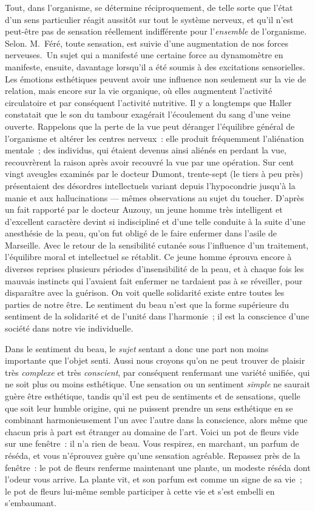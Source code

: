 \documentclass[french,twoside]{book} %
\begin{document}
Tout, dans l’organisme, se détermine réciproquement, de telle sorte que l’état d’un sens particulier réagit aussitôt sur tout le système nerveux, et qu’il n’est peut-être pas de sensation réellement indifférente pour l’\emph{ensemble} de l’organisme. Selon. M. Féré, toute sensation, est suivie d’une augmentation de nos forces nerveuses. Un sujet qui a manifesté une certaine force au dynamomètre en manifeste, ensuite, davantage lorsqu’il a été soumis à des excitations sensorielles. Les émotions esthétiques peuvent avoir une influence non seulement sur la vie de relation, mais encore sur la vie organique, où elles augmentent l’activité circulatoire et par conséquent l’activité nutritive. Il y a longtemps que Haller constatait que le son du tambour exagérait l’écoulement du sang d’une veine ouverte. Rappelons que la perte de la vue peut déranger l’équilibre général de l’organisme et altérer les centres nerveux : elle produit fréquemment l’aliénation mentale ; des individus, qui étaient devenus ainsi aliénés en perdant la vue, recouvrèrent la raison après avoir recouvré la vue par une opération. Sur cent vingt aveugles examinés par le docteur Dumont, trente-sept (le tiers à peu près) présentaient des désordres intellectuels variant depuis l’hypocondrie jusqu’à la manie et aux hallucinations — mêmes observations au sujet du toucher. D’après un fait rapporté par le docteur Auzouy, un jeune homme très intelligent et d’excellent caractère devint si indiscipliné et d’une telle conduite à la suite d’une anesthésie de la peau, qu’on fut obligé de le faire enfermer dans l’asile de Marseille. Avec le retour de la sensibilité cutanée sous l’influence d’un traitement, l’équilibre moral et intellectuel se rétablit. Ce jeune homme éprouva encore à diverses reprises plusieurs périodes d’insensibilité de la peau, et à chaque fois les mauvais instincts qui l’avaient fait enfermer ne tardaient pas à se réveiller, pour disparaître avec la guérison. On voit quelle solidarité existe entre toutes les parties de notre être. Le sentiment du beau n’est que la forme supérieure du sentiment de la solidarité et de l’unité dans l’harmonie ; il est la conscience d’une société dans notre vie individuelle.\par
Dans le sentiment du beau, le \emph{sujet} sentant a donc une part non moins importante que l’objet senti. Aussi nous croyons qu’on ne peut trouver de plaisir très \emph{complexe} et très \emph{conscient}, par conséquent renfermant une variété unifiée, qui ne soit plus ou moins esthétique. Une sensation ou un sentiment \emph{simple} ne saurait guère être esthétique, tandis qu’il est peu de sentiments et de sensations, quelle que soit leur humble origine, qui ne puissent prendre un sens esthétique en se combinant harmonieusement l’un avec l’autre dans la conscience, alors même que chacun pris à part est étranger au domaine de l’art. Voici un pot de fleurs vide sur une fenêtre : il n’a rien de beau. Vous respirez, en marchant, un parfum de réséda, et vous n’éprouvez guère qu’une sensation agréable. Repassez près de la fenêtre : le pot de fleurs renferme maintenant une plante, un modeste réséda dont l’odeur vous arrive. La plante vit, et son parfum est comme un signe de sa vie ; le pot de fleurs lui-même semble participer à cette vie et s’est embelli en s’embaumant.\par
\end{document}
